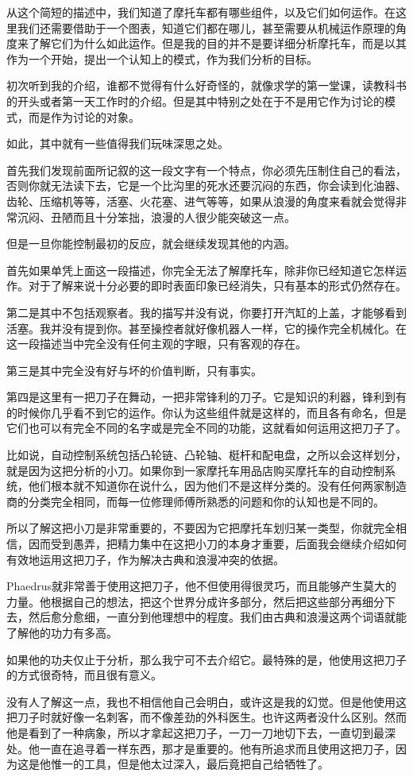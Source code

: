 \documentclass[UTF8]{article}
\begin{document}
\par 从这个简短的描述中，我们知道了摩托车都有哪些组件，以及它们如何运作。在这里我们还需要借助于一个图表，知道它们都在哪儿，甚至需要从机械运作原理的角度来了解它们为什么如此运作。但是我的目的并不是要详细分析摩托车，而是以其作为一个开始，提出一个认知上的模式，作为我们分析的目标。
\par 初次听到我的介绍，谁都不觉得有什么好奇怪的，就像求学的第一堂课，读教科书的开头或者第一天工作时的介绍。但是其中特别之处在于不是用它作为讨论的模式，而是作为讨论的对象。
\par 如此，其中就有一些值得我们玩味深思之处。
\par 首先我们发现前面所记叙的这一段文字有一个特点，你必须先压制住自己的看法，否则你就无法读下去，它是一个比沟里的死水还要沉闷的东西，你会读到化油器、齿轮、压缩机等等，活塞、火花塞、进气等等，如果从浪漫的角度来看就会觉得非常沉闷、丑陋而且十分笨拙，浪漫的人很少能突破这一点。
\par 但是一旦你能控制最初的反应，就会继续发现其他的内涵。
\par 首先如果单凭上面这一段描述，你完全无法了解摩托车，除非你已经知道它怎样运作。对于了解来说十分必要的即时表面印象已经消失，只有基本的形式仍然存在。
\par 第二是其中不包括观察者。我的描写并没有说，你要打开汽缸的上盖，才能够看到活塞。我并没有提到你。甚至操控者就好像机器人一样，它的操作完全机械化。在这一段描述当中完全没有任何主观的字眼，只有客观的存在。
\par 第三是其中完全没有好与坏的价值判断，只有事实。
\par 第四是这里有一把刀子在舞动，一把非常锋利的刀子。它是知识的利器，锋利到有的时候你几乎看不到它的运作。你认为这些组件就是这样的，而且各有命名，但是它们也可以有完全不同的名字或是完全不同的功能，这就看如何运用这把刀子了。
\par 比如说，自动控制系统包括凸轮链、凸轮轴、梃杆和配电盘，之所以会这样划分，就是因为这把分析的小刀。如果你到一家摩托车用品店购买摩托车的自动控制系统，他们根本就不知道你在说什么，因为他们不是这样分类的。没有任何两家制造商的分类完全相同，而每一位修理师傅所熟悉的问题和你的认知也是不同的。
\par 所以了解这把小刀是非常重要的，不要因为它把摩托车划归某一类型，你就完全相信，因而受到愚弄，把精力集中在这把小刀的本身才重要，后面我会继续介绍如何有效地运用这把刀子，作为解决古典和浪漫冲突的依据。
\par Phaedrus就非常善于使用这把刀子，他不但使用得很灵巧，而且能够产生莫大的力量。他根据自己的想法，把这个世界分成许多部分，然后把这些部分再细分下去，然后愈分愈细，一直分到他理想中的程度。我们由古典和浪漫这两个词语就能了解他的功力有多高。
\par 如果他的功夫仅止于分析，那么我宁可不去介绍它。最特殊的是，他使用这把刀子的方式很奇特，而且很有意义。
\par 没有人了解这一点，我也不相信他自己会明白，或许这是我的幻觉。但是他使用这把刀子时就好像一名刺客，而不像差劲的外科医生。也许这两者没什么区别。然而他是看到了一种病象，所以才拿起这把刀子，一刀一刀地切下去，一直切到最深处。他一直在追寻着一样东西，那才是重要的。他有所追求而且使用这把刀子，因为这是他惟一的工具，但是他太过深入，最后竟把自己给牺牲了。
\end{document}
